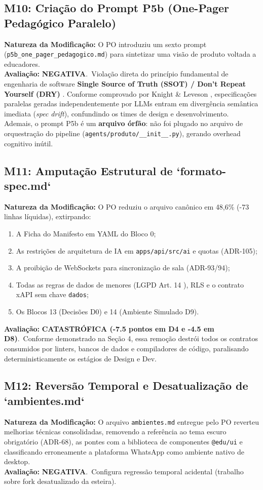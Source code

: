 \documentclass[11pt,a4paper]{article}
\begin{document}
\subsection{M10: Criação do Prompt P5b (One-Pager Pedagógico Paralelo)}
\textbf{Natureza da Modificação:} O PO introduziu um sexto prompt (\texttt{p5b\_one\_pager\_pedagogico.md}) para sintetizar uma visão de produto voltada a educadores.\\
\textbf{Avaliação:} \color{DarkRed}\textbf{NEGATIVA}.\normalfont\ Violação direta do princípio fundamental de engenharia de software \textbf{Single Source of Truth (SSOT) / Don't Repeat Yourself (DRY)} \cite{hunt1999pragmatic,parnas1972criteria}. Conforme comprovado por Knight \& Leveson \cite{knight1986experimental}, especificações paralelas geradas independentemente por LLMs entram em divergência semântica imediata (\textit{spec drift}), confundindo os times de design e desenvolvimento. Ademais, o prompt P5b é um \textbf{arquivo órfão}: não foi plugado no arquivo de orquestração do pipeline (\texttt{agents/produto/\_\_init\_\_.py}), gerando overhead cognitivo inútil.

\subsection{M11: Amputação Estrutural de `formato-spec.md`}
\textbf{Natureza da Modificação:} O PO reduziu o arquivo canônico em 48,6\% (-73 linhas líquidas), extirpando:
\begin{enumerate}
    \item A Ficha do Manifesto em YAML do Bloco 0;
    \item As restrições de arquitetura de IA em \texttt{apps/api/src/ai} e quotas (ADR-105);
    \item A proibição de WebSockets para sincronização de sala (ADR-93/94);
    \item Todas as regras de dados de menores (LGPD Art. 14 \cite{brasil2018lgpd}), RLS e o contrato xAPI sem chave \texttt{dados};
    \item Os Blocos 13 (Decisões D0) e 14 (Ambiente Simulado D9).
\end{enumerate}
\textbf{Avaliação:} \color{DarkRed}\textbf{CATASTRÓFICA (-7.5 pontos em D4 e -4.5 em D8)}.\normalfont\ Conforme demonstrado na Seção 4, essa remoção destrói todos os contratos consumidos por linters, bancos de dados e compiladores de código, paralisando deterministicamente os estágios de Design e Dev.

\subsection{M12: Reversão Temporal e Desatualização de `ambientes.md`}
\textbf{Natureza da Modificação:} O arquivo \texttt{ambientes.md} entregue pelo PO reverteu melhorias técnicas consolidadas, removendo a referência ao tema escuro obrigatório (ADR-68), as pontes com a biblioteca de componentes \texttt{@edu/ui} e classificando erroneamente a plataforma WhatsApp como ambiente nativo de desktop.\\
\textbf{Avaliação:} \color{DarkRed}\textbf{NEGATIVA}.\normalfont\ Configura regressão temporal acidental (trabalho sobre fork desatualizado da esteira).
\end{document}
